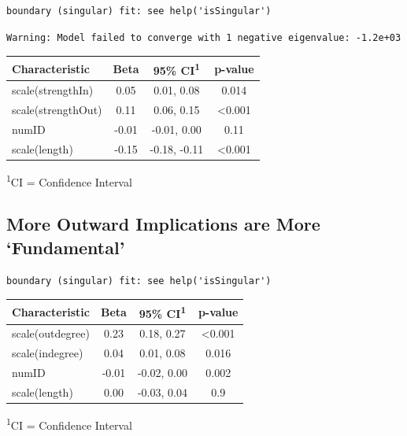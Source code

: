 \documentclass[
  .7em,
  letterpaper,
  DIV=11,
  numbers=noendperiod]{scrartcl}
\begin{document}
\begin{verbatim}
boundary (singular) fit: see help('isSingular')
\end{verbatim}

\begin{verbatim}
Warning: Model failed to converge with 1 negative eigenvalue: -1.2e+03
\end{verbatim}

\captionsetup[table]{labelformat=empty,skip=1pt}
\setlength{\LTpost}{0mm}
\begin{longtable}{lccc}
\toprule
\textbf{Characteristic} & \textbf{Beta} & \textbf{95\% CI}\textsuperscript{1} & \textbf{p-value} \\ 
\midrule
scale(strengthIn) & 0.05 & 0.01, 0.08 & 0.014 \\ 
scale(strengthOut) & 0.11 & 0.06, 0.15 & <0.001 \\ 
numID & -0.01 & -0.01, 0.00 & 0.11 \\ 
scale(length) & -0.15 & -0.18, -0.11 & <0.001 \\ 
\bottomrule
\end{longtable}
\begin{minipage}{\linewidth}
\textsuperscript{1}CI = Confidence Interval\\
\end{minipage}

\hypertarget{more-outward-implications-are-more-fundamental}{%
\subsection{More Outward Implications are More
`Fundamental'}\label{more-outward-implications-are-more-fundamental}}

\begin{verbatim}
boundary (singular) fit: see help('isSingular')
\end{verbatim}

\captionsetup[table]{labelformat=empty,skip=1pt}
\setlength{\LTpost}{0mm}
\begin{longtable}{lccc}
\toprule
\textbf{Characteristic} & \textbf{Beta} & \textbf{95\% CI}\textsuperscript{1} & \textbf{p-value} \\ 
\midrule
scale(outdegree) & 0.23 & 0.18, 0.27 & <0.001 \\ 
scale(indegree) & 0.04 & 0.01, 0.08 & 0.016 \\ 
numID & -0.01 & -0.02, 0.00 & 0.002 \\ 
scale(length) & 0.00 & -0.03, 0.04 & 0.9 \\ 
\bottomrule
\end{longtable}
\begin{minipage}{\linewidth}
\textsuperscript{1}CI = Confidence Interval\\
\end{minipage}
\end{document}
